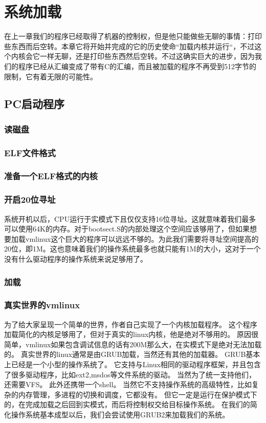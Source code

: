 \chapter{系统加载}

在上一章我们的程序已经取得了机器的控制权，但是他只能做些无聊的事情：打印些东西而后空转。本章它将开始并完成的它的历史使命“加载内核并运行“，不过这个内核会它一样无聊，还是打印些东西然后空转。不过这确实巨大的进步，因为我们的程序已经从汇编变成了带有C的汇编，而且被加载的程序不再受到512字节的限制，它有着无限的可能性。
\section{PC启动程序}
\subsection{读磁盘}
\subsection{ELF文件格式}
\subsection{准备一个ELF格式的内核}
\subsection{开启20位寻址}
系统开机以后，CPU运行于实模式下且仅仅支持16位寻址。这就意味着我们最多可以使用64K的内存。对于bootsect.S的内部处理这个空间应该够用了，但如果想要加载vmlinux这个巨大的程序可以远远不够的。为此我们需要将寻址空间提高的20位，即1M。这也意味着我们的操作系统最多也就只能有1M的大小，这对于一个没有什么驱动程序的操作系统来说足够用了。
\subsection{加载}
\subsection{真实世界的vmlinux}
为了给大家呈现一个简单的世界，作者自己实现了一个内核加载程序。
这个程序加载简化的内核足够用了，但对于真实的linux内核，他是绝对不够用的。
原因很简单，vmlinux如果包含调试信息的话有200M那么大，在实模式下是绝对无法加载的。
真实世界的linux通常是由GRUB加载，当然还有其他的加载器。
GRUB基本上已经是一个小型的操作系统了。
它支持与Linux相同的驱动程序框架，并且包含了很多驱动程序，比如ext2,msdos等文件系统的驱动。
当然为了统一支持他们，还需要VFS。
此外还携带一个shell。
当然它不支持操作系统的高级特性，比如复杂的内存管理，多进程的切换和调度，它都没有。
但它一定是运行在保护模式下的，在完成加载之后回到实模式，而后将控制权交给目标操作系统。
在我们的简化操作系统基本成型以后，我们会尝试使用GRUB2来加载我们的系统。
